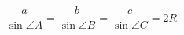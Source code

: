 \newpage
\section{
 }

\begin{figure}[h!]
	\centering
\end{figure}

\begin{equation}
	\frac{a}{\sin\angle{A}} = \frac{b}{\sin\angle{B}} = \frac{c}{\sin\angle{C}} = 2R
\end{equation}
